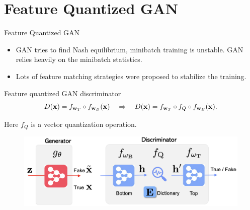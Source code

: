 \section{Feature Quantized GAN}
\begin{frame}{Feature Quantized GAN}
	\begin{itemize}
		\item GAN tries to find Nash equilibrium, minibatch training is unstable. GAN relies heavily on the minibatch statistics.
		\item Lots of feature matching strategies were proposed to stabilize the training. 
	\end{itemize}
	\begin{block}{Feature quantized GAN discriminator}
		\[
			D(\mathbf{x}) = f_{\mathbf{w}_T} \circ f_{\mathbf{w}_B}(\mathbf{x}) \quad \Rightarrow \quad D(\mathbf{x}) = f_{\mathbf{w}_T} \circ f_Q \circ f_{\mathbf{w}_B}(\mathbf{x}). 
		\]
	\end{block}
	Here $f_Q$ is a vector quantization operation.
	\begin{figure}
		\centering
		\includegraphics[width=0.7\linewidth]{figs/fqgan}
	\end{figure}
\end{frame}

